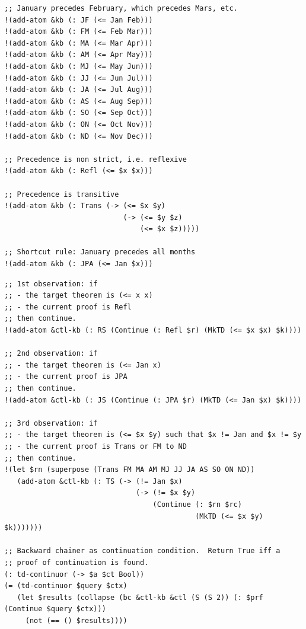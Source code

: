 \documentclass[aspectratio=169]{beamer}
\begin{document}
\begin{frame}[fragile]

  \begin{lstlisting}
;; January precedes February, which precedes Mars, etc.
!(add-atom &kb (: JF (<= Jan Feb)))
!(add-atom &kb (: FM (<= Feb Mar)))
!(add-atom &kb (: MA (<= Mar Apr)))
!(add-atom &kb (: AM (<= Apr May)))
!(add-atom &kb (: MJ (<= May Jun)))
!(add-atom &kb (: JJ (<= Jun Jul)))
!(add-atom &kb (: JA (<= Jul Aug)))
!(add-atom &kb (: AS (<= Aug Sep)))
!(add-atom &kb (: SO (<= Sep Oct)))
!(add-atom &kb (: ON (<= Oct Nov)))
!(add-atom &kb (: ND (<= Nov Dec)))

;; Precedence is non strict, i.e. reflexive
!(add-atom &kb (: Refl (<= $x $x)))

;; Precedence is transitive
!(add-atom &kb (: Trans (-> (<= $x $y)
                            (-> (<= $y $z)
                                (<= $x $z)))))

;; Shortcut rule: January precedes all months
!(add-atom &kb (: JPA (<= Jan $x)))
  \end{lstlisting}

\end{frame}

\begin{frame}[fragile]
  \begin{lstlisting}
;; 1st observation: if
;; - the target theorem is (<= x x)
;; - the current proof is Refl
;; then continue.
!(add-atom &ctl-kb (: RS (Continue (: Refl $r) (MkTD (<= $x $x) $k))))

;; 2nd observation: if
;; - the target theorem is (<= Jan x)
;; - the current proof is JPA
;; then continue.
!(add-atom &ctl-kb (: JS (Continue (: JPA $r) (MkTD (<= Jan $x) $k))))

;; 3rd observation: if
;; - the target theorem is (<= $x $y) such that $x != Jan and $x != $y
;; - the current proof is Trans or FM to ND
;; then continue.
!(let $rn (superpose (Trans FM MA AM MJ JJ JA AS SO ON ND))
   (add-atom &ctl-kb (: TS (-> (!= Jan $x)
                               (-> (!= $x $y)
                                   (Continue (: $rn $rc)
                                             (MkTD (<= $x $y) $k)))))))

;; Backward chainer as continuation condition.  Return True iff a
;; proof of continuation is found.
(: td-continuor (-> $a $ct Bool))
(= (td-continuor $query $ctx)
   (let $results (collapse (bc &ctl-kb &ctl (S (S 2)) (: $prf (Continue $query $ctx)))
     (not (== () $results))))
  \end{lstlisting}
\end{frame}
\end{document}
